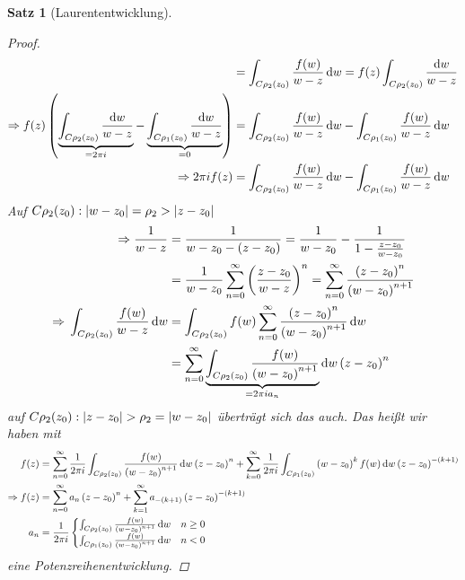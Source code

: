 \documentclass[11pt, a4paper]{article}
\theoremstyle{plain}
\newtheorem{satz}[blockelement]{Satz}
\numberwithin{equation}{subsection}
\newcommand{\pair}[1]{\left(#1\right)}
\newcommand{\of}[1]{\mathopen{}\mathclose{}\bgroup\left(#1\aftergroup\egroup\right)}
\newcommand{\abs}[1]{\left\lvert#1\right\rvert}
\newcommand{\impl}[0]{\Rightarrow{}}
\newcommand{\dif}{\mathop{}\!\mathrm{d}}
\begin{document}
\begin{satz}[Laurententwicklung]
\begin{proof}
\begin{align*}
                &= \int_{C\rho_2\of{z_0}}^{} \frac{f\of{w}}{w-z} \dif w = f\of{z} \int_{C\rho_2\of{z_0}} \frac{\dif w}{w-z}\\
                \impl f\of{z} \pair{\underbrace{\int_{C\rho_2\of{z_0}}^{} \frac{\dif w}{w-z}}_{=2\pi i} - \underbrace{\int_{C\rho_1\of{z_0}}^{} \frac{\dif w}{w-z}}_{=0}} &= \int_{C\rho_2\of{z_0}}^{} \frac{f\of{w}}{w-z} \dif w - \int_{C\rho_1\of{z_0}}^{} \frac{f\of{w}}{w-z} \dif w\\
                \impl 2\pi i f\of{z} &= \int_{C\rho_2\of{z_0}}^{} \frac{f\of{w}}{w-z} \dif w - \int_{C\rho_1\of{z_0}}^{} \frac{f\of{w}}{w-z} \dif w
            \end{align*}
            Auf $C\rho_2\of{z_0}: \abs{w-z_0} = \rho_2 > \abs{z-z_0}$
            \begin{align*}
                \impl \frac{1}{w-z} &= \frac{1}{w-z_0 - \pair{z-z_0}} = \frac{1}{w-z_0} - \frac{1}{1-\frac{z-z_0}{w-z_0}}\\
                &= \frac{1}{w-z_0} \sum_{n=0}^{\infty} \pair{\frac{z-z_0}{w-z}}^n = \sum_{n=0}^{\infty} \frac{\pair{z-z_0}^n}{\pair{w-z_0}^{n+1}}\\
                \impl \int_{C\rho_2\of{z_0}}^{} \frac{f\of{w}}{w-z} \dif w &= \int_{C\rho_2\of{z_0}}^{} f\of{w} \sum_{n=0}^{\infty} \frac{\pair{z-z_0}^n}{\pair{w-z_0}^{n+1}} \dif w\\
                &= \sum_{n=0}^{\infty} \underbrace{\int_{C\rho_2\of{z_0}}^{} \frac{f\of{w}}{\pair{w-z_0}^{n+1}}}_{=2\pi i a_n} \dif w \pair{z-z_0}^n
            \end{align*}
            auf $C\rho_2\of{z_0}: \abs{z-z_0} > \rho_2 = \abs{w-z_0}$ überträgt sich das auch. Das heißt wir haben mit
            \begin{align*}
                f\of{z} &= \sum_{n=0}^{\infty} \frac{1}{2\pi i} \int_{C\rho_2\of{z_0}}^{} \frac{f\of{w}}{\pair{w-z_0}^{n+1}} \dif w \pair{z-z_0}^n + \sum_{k=0}^{\infty} \frac{1}{2\pi i}\int_{C\rho_1\of{z_0}}^{} \pair{w-z_0}^k f\of{w}\dif w \pair{z-z_0}^{-\pair{k+1}}\\
                \impl f\of{z} &= \sum_{n=0}^{\infty} a_n \pair{z-z_0}^n + \sum_{k=1}^{\infty} a_{-\pair{k+1}} \pair{z-z_0}^{-\pair{k+1}}\\
                a_n &= \frac{1}{2\pi i}\begin{cases}
                                           \int_{C\rho_2\of{z_0}}^{} \frac{f\of{w}}{\pair{w-z_0}^{n+1}} \dif w &n \geq 0\\
                                           \int_{C\rho_1\of{z_0}}^{} \frac{f\of{w}}{\pair{w-z_0}^{n+1}} \dif w &n < 0
                \end{cases}
            \end{align*}
            eine Potenzreihenentwicklung.
        \end{proof}
    \end{satz}
\end{document}
